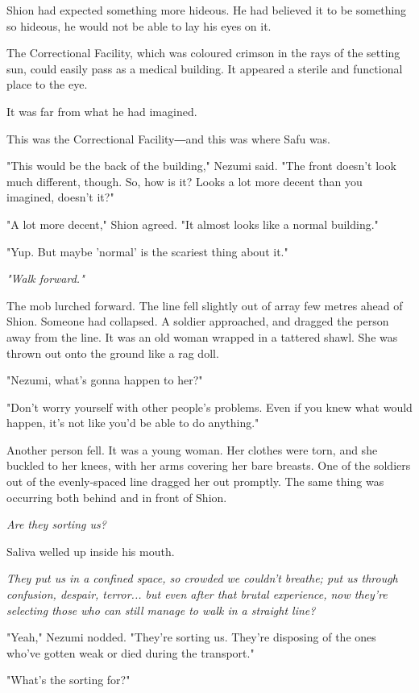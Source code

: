 Shion had expected something more hideous. He had believed it to be
something so hideous, he would not be able to lay his eyes on it.~

The Correctional Facility, which was coloured crimson in the rays of the
setting sun, could easily pass as a medical building. It appeared a
sterile and functional place to the eye.

It was far from what he had imagined.

This was the Correctional Facility―and this was where Safu was.

"This would be the back of the building," Nezumi said. "The front
doesn't look much different, though. So, how is it? Looks a lot more
decent than you imagined, doesn't it?"

"A lot more decent," Shion agreed. "It almost looks like a normal
building."

"Yup. But maybe 'normal' is the scariest thing about it."

\emph{"Walk forward."}

The mob lurched forward. The line fell slightly out of array few metres
ahead of Shion. Someone had collapsed. A soldier approached, and dragged
the person away from the line. It was an old woman wrapped in a tattered
shawl. She was thrown out onto the ground like a rag doll.

"Nezumi, what's gonna happen to her?"

"Don't worry yourself with other people's problems. Even if you knew
what would happen, it's not like you'd be able to do anything."

Another person fell. It was a young woman. Her clothes were torn, and
she buckled to her knees, with her arms covering her bare breasts. One
of the soldiers out of the evenly-spaced line dragged her out promptly.
The same thing was occurring both behind and in front of Shion.

\emph{Are they sorting us?}

Saliva welled up inside his mouth.

\emph{They put us in a confined space, so crowded we couldn't breathe;
put us through confusion, despair, terror... but even after that brutal
experience, now they're selecting those who can still manage to walk in
a straight line?}

"Yeah," Nezumi nodded. "They're sorting us. They're disposing of the
ones who've gotten weak or died during the transport."

"What's the sorting for?"

